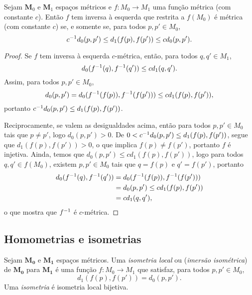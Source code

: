 \begin{proposition}
Sejam $\bm M_0$ e $\bm M_1$ espaços métricos e $f\colon M_0 \to M_1$ uma função métrica (com constante $c$). Então $f$ tem inversa à esquerda que restrita a $f(M_0)$ é métrica (com constante $c$) se, e somente se, para todos $p,p' \in M_0$,
	\begin{equation*}
	c^{-1} d_0(p,p') \leq d_1(f(p),f(p')) \leq cd_0(p,p').
	\end{equation*}
\end{proposition}
\begin{proof}
Se $f$ tem inversa à esquerda $c$-métrica, então, para todos $q,q' \in M_1$,
	\begin{equation*}
	d_0(f^{-1}(q),f^{-1}(q')) \leq c d_1(q,q').
	\end{equation*}
Assim, para todos $p,p' \in M_0$,
	\begin{equation*}
	d_0(p,p') = d_0(f^{-1}(f(p)),f^{-1}(f(p'))) \leq c d_1(f(p),f(p')),
	\end{equation*}
portanto $c^{-1} d_0(p,p') \leq d_1(f(p),f(p'))$.

Reciprocamente, se valem as desigualdades acima, então para todos $p,p' \in M_0$ tais que $p \neq p'$, logo $d_0(p,p') > 0$. De $0 < c^{-1} d_0(p,p') \leq d_1(f(p),f(p'))$, segue que $d_1(f(p),f(p'))>0$, o que implica $f(p) \neq f(p')$, portanto $f$ é injetiva. Ainda, temos que $d_0(p,p') \leq c d_1(f(p),f(p'))$, logo para todos $q,q' \in f(M_0)$, existem $p,p' \in M_0$ tais que $q=f(p)$ e $q'=f(p')$, portanto
	\begin{align*}
	d_0(f^{-1}(q),f^{-1}(q')) &= d_0(f^{-1}(f(p)),f^{-1}(f(p'))) \\
		&= d_0(p,p') \leq c d_1(f(p),f(p')) \\
		&= c d_1(q,q'),
	\end{align*}
o que mostra que $f^{-1}$ é $c$-métrica.


\end{proof}

\subsection{Homometrias e isometrias}

\begin{definition}
Sejam $\bm{M_0}$ e $\bm{M_1}$ espaços métricos. Uma \emph{isometria local} ou (\emph{imersão isométrica}) de $\bm{M_0}$ para $\bm{M_1}$ é uma função $f\colon M_0 \to M_1$ que satisfaz, para todos $p,p' \in M_0$,
	\begin{equation*}
	d_1(f(p),f(p')) = d_0(p,p').
	\end{equation*}
Uma \emph{isometria} é isometria local bijetiva.
\end{definition}

